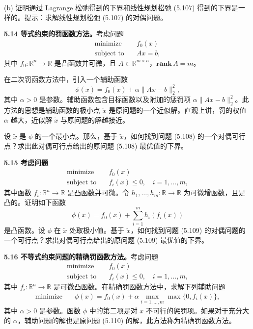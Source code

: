 \documentclass[UTF8, 12pt, fontset=fandol, oneside]{ctexart}
\begin{document}
(b) 证明通过 Lagrange 松弛得到的下界和线性规划松弛 (5.107) 得到的下界是一样的。提示：求解线性规划松弛 (5.107) 的对偶问题。

\noindent\textbf{5.14 等式约束的罚函数方法。}\quad 考虑问题
\begin{equation}
\begin{aligned}
\text{minimize}\quad & f_0(x)\\
\text{subject to}\quad & Ax=b,
\end{aligned}
\tag{5.108}
\end{equation}
其中 $f_0:\mathbb{R}^n\to\mathbb{R}$ 是凸函数并可微，且 $A\in\mathbb{R}^{m\times n}$，$\mathbf{rank}\,A=m$。

在二次罚函数方法中，引入一个辅助函数
\[
\phi(x)=f_0(x)+\alpha\|Ax-b\|_2^2,
\]
其中 $\alpha>0$ 是参数。辅助函数包含目标函数以及附加的惩罚项 $\alpha\|Ax-b\|_2^2$。此方法的思想是辅助函数的极小点 $\tilde{x}$ 是原问题的一个近似解。直观上讲，罚的权值 $\alpha$ 越大，近似解 $\tilde{x}$ 与原问题的解越接近。

设 $\tilde{x}$ 是 $\phi$ 的一个最小点。那么，基于 $\tilde{x}$，如何找到问题 (5.108) 的一个对偶可行点？求出此对偶可行点给出的原问题 (5.108) 最优值的下界。

\noindent\textbf{5.15 考虑问题}
\begin{equation}
\begin{aligned}
\text{minimize}\quad & f_0(x)\\
\text{subject to}\quad & f_i(x)\leq 0,\quad i=1,\ldots,m,
\end{aligned}
\tag{5.109}
\end{equation}
其中函数 $f_i:\mathbb{R}^n\to\mathbb{R}$ 是凸函数并可微。令 $h_1,\ldots,h_m:\mathbb{R}\to\mathbb{R}$ 为可微增函数，且是凸的。证明如下函数
\[
\phi(x)=f_0(x)+\sum_{i=1}^m h_i(f_i(x))
\]
是凸函数。设 $\phi$ 在 $\tilde{x}$ 处取极小值。基于 $\tilde{x}$，如何找到问题 (5.109) 的对偶问题的一个可行点？求出对偶可行点给出的原问题 (5.109) 最优值的下界。

\noindent\textbf{5.16 不等式约束问题的精确罚函数方法。}\quad 考虑问题
\begin{equation}
\begin{aligned}
\text{minimize}\quad & f_0(x)\\
\text{subject to}\quad & f_i(x)\leq 0,\quad i=1,\ldots,m,
\end{aligned}
\tag{5.110}
\end{equation}
其中 $f_i:\mathbb{R}^n\to\mathbb{R}$ 是可微凸函数。在精确罚函数方法中，求解下列辅助问题
\begin{equation}
\begin{aligned}
\text{minimize}\quad & \phi(x)=f_0(x)+\alpha\max_{i=1,\ldots,m}\max\{0,f_i(x)\},
\end{aligned}
\tag{5.111}
\end{equation}
其中 $\alpha>0$ 是参数。函数 $\phi$ 中的第二项是对 $x$ 不可行的惩罚项。如果对于充分大的 $\alpha$，辅助问题的解也是原问题 (5.110) 的解，此方法称为精确罚函数方法。
\end{document}
